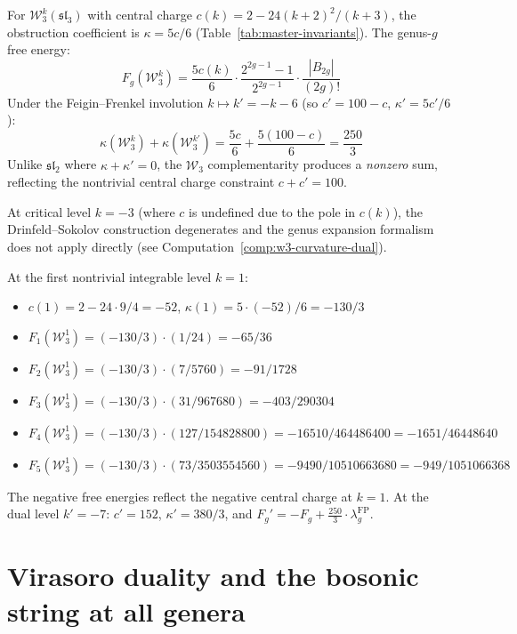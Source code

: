 \begin{computation}\label{comp:w3-genus-expansion}
For $\mathcal{W}_3^k(\mathfrak{sl}_3)$ with central charge $c(k) = 2 - 24(k+2)^2/(k+3)$, the obstruction coefficient is $\kappa = 5c/6$ (Table~\ref{tab:master-invariants}).  The genus-$g$ free energy:
\begin{equation}\label{eq:w3-Fg}
F_g(\mathcal{W}_3^k) = \frac{5c(k)}{6} \cdot \frac{2^{2g-1}-1}{2^{2g-1}} \cdot \frac{|B_{2g}|}{(2g)!}
\end{equation}
Under the Feigin--Frenkel involution $k \mapsto k' = -k-6$ (so $c' = 100 - c$, $\kappa' = 5c'/6$):
\[
\kappa(\mathcal{W}_3^k) + \kappa(\mathcal{W}_3^{k'}) = \frac{5c}{6} + \frac{5(100-c)}{6} = \frac{250}{3}
\]
Unlike $\widehat{\mathfrak{sl}}_2$ where $\kappa + \kappa' = 0$, the $\mathcal{W}_3$ complementarity produces a \emph{nonzero} sum, reflecting the nontrivial central charge constraint $c + c' = 100$.

At critical level $k = -3$ (where $c$ is undefined due to the pole in $c(k)$), the Drinfeld--Sokolov construction degenerates and the genus expansion formalism does not apply directly (see Computation~\ref{comp:w3-curvature-dual}).

\medskip
\noindent
At the first nontrivial integrable level $k = 1$:
\begin{itemize}
\item $c(1) = 2 - 24 \cdot 9/4 = -52$, \quad $\kappa(1) = 5 \cdot (-52)/6 = -130/3$
\item $F_1(\mathcal{W}_3^1) = (-130/3) \cdot (1/24) = -65/36$
\item $F_2(\mathcal{W}_3^1) = (-130/3) \cdot (7/5760) = -91/1728$
\item $F_3(\mathcal{W}_3^1) = (-130/3) \cdot (31/967680) = -403/290304$
\item $F_4(\mathcal{W}_3^1) = (-130/3) \cdot (127/154828800) = -16510/464486400 = -1651/46448640$
\item $F_5(\mathcal{W}_3^1) = (-130/3) \cdot (73/3503554560) = -9490/10510663680 = -949/1051066368$
\end{itemize}
The negative free energies reflect the negative central charge at $k = 1$.  At the dual level $k' = -7$: $c' = 152$, $\kappa' = 380/3$, and $F_g' = -F_g + \frac{250}{3} \cdot \lambda_g^{\mathrm{FP}}$.
\end{computation}

\section{Virasoro duality and the bosonic string at all genera}\label{sec:virasoro-all-genera}

